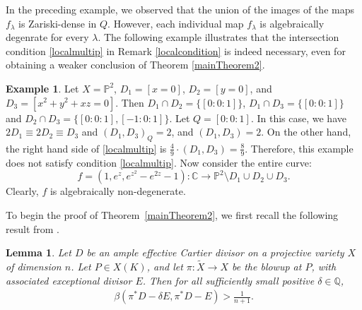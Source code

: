 \documentclass[10pt]{amsart}
\numberwithin{equation}{section}
\theoremstyle{plain}
\newtheorem{lemma}[theorem]{Lemma}
\theoremstyle{definition}
\newtheorem{example}[theorem]{Example}
\begin{document}
      
In the preceding example, we observed that the union of the images of the maps  $f_{\lambda}$  is Zariski-dense in $Q$.  However, each individual map $f_{\lambda}$ is algebraically degenrate for every $\lambda$.  The following example illustrates that the intersection condition \eqref{localmultip} in Remark \ref{localcondition}   is indeed necessary, even for obtaining a weaker conclusion of  Theorem \ref{mainTheorem2}.
\begin{example}
Let $X=\mathbb P^2$, $D_1=[x=0]$, $D_2=[y=0]$, and $D_3=[x^2+y^2+xz=0]$.  Then $D_1\cap D_2=
\{[0:0:1]\}$, $D_1\cap D_3=\{[0:0:1]\}$ and $D_2\cap D_3=\{[0:0:1], [-1:0:1]\}$.  Let $Q=[0:0:1]$.
In this case, we have $2D_1\equiv 2D_2\equiv D_3$ and 
$ (D_1,D_3)_Q=2$, and $(D_1,D_3)=2$.  On the other hand, the  right  hand side of \eqref{localmultip} is  $\frac 49\cdot (D_1,D_3)=\frac{8}9$. Therefore, this example  does not satisfy condition  \eqref{localmultip}.
Now consider the entire curve:
$$f=(1,e^z,e^{z^2}-e^{2z}-1):\mathbb C\to \mathbb P^2\setminus D_1\cup D_2\cup D_3.$$
Clearly, $f$ is algebraically non-degenerate.
\end{example}
 
To begin the proof of Theorem~\ref{mainTheorem2}, we first recall the following result from \cite{HLX}.
\begin{lemma}
\label{exclemma}{\cite[Lemma 3.14]{HLX}}
Let $D$ be an ample effective Cartier divisor on a projective variety $X$ of dimension $n$. Let $P\in X(K)$, and let $\pi:\tilde{X}\to X$ be the blowup at $P$, with associated exceptional divisor $E$.  Then for all sufficiently small positive $\delta\in\mathbb{Q}$,
\begin{align}
\label{exceqn}
\beta(\pi^*D-\delta E, \pi^*D-E)>\frac{1}{n+1}.
\end{align}
\end{lemma}
\end{document}
